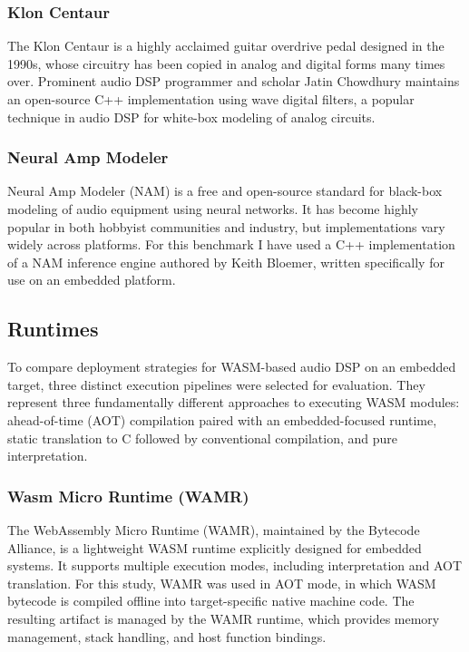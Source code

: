 \documentclass[a4paper]{article}
\begin{document}
\subsubsection{ Klon Centaur }

The Klon Centaur is a highly acclaimed guitar overdrive pedal designed in the 1990s, whose circuitry has been copied in analog and digital forms many times over\cite{chowdhury2020comparison}. Prominent audio DSP programmer and scholar Jatin Chowdhury maintains an open-source C++ implementation using wave digital filters, a popular technique in audio DSP for white-box modeling of analog circuits.

\subsubsection{ Neural Amp Modeler }

Neural Amp Modeler (NAM)\cite{neuralampmodeler} is a free and open-source standard for black-box modeling of audio equipment using neural networks. It has become highly popular in both hobbyist communities and industry, but implementations vary widely across platforms. For this benchmark I have used a C++ implementation of a NAM inference engine authored by Keith Bloemer\cite{guitarml_mercury}, written specifically for use on an embedded platform. 


\subsection{ Runtimes }

To compare deployment strategies for WASM-based audio DSP on an embedded target, three distinct execution pipelines were selected for evaluation. They represent three fundamentally different approaches to executing WASM modules: ahead-of-time (AOT) compilation paired with an embedded-focused runtime, static translation to C followed by conventional compilation, and pure interpretation.

\subsubsection{ Wasm Micro Runtime (WAMR) }

The WebAssembly Micro Runtime (WAMR), maintained by the Bytecode Alliance\cite{bytecode_alliance}, is a lightweight WASM runtime explicitly designed for embedded systems. It supports multiple execution modes, including interpretation and AOT translation. For this study, WAMR was used in AOT mode, in which WASM bytecode is compiled offline into target-specific native machine code. The resulting artifact is managed by the WAMR runtime, which provides memory management, stack handling, and host function bindings. 
\end{document}
